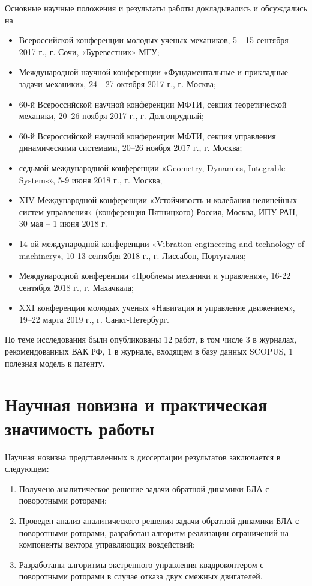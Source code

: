 Основные научные положения и результаты работы докладывались и обсуждались на 
\begin{itemize}
\item Всероссийской конференции молодых ученых-механиков, 5 - 15 сентября 2017 г., г. Сочи, «Буревестник» МГУ;
\item Международной научной конференции «Фундаментальные и прикладные задачи механики», 24 - 27 октября 2017 г., г. Москва;
\item 60-й Всероссийской научной конференции МФТИ, секция теоретической механики, 20–26 ноября 2017 г., г. Долгопрудный;
\item 60-й Всероссийской научной конференции МФТИ, секция управления динамическими системами, 20–26 ноября 2017 г., г. Москва;
\item седьмой международной конференции «Geometry, Dynamics, Integrable Systems», 5-9 июня 2018 г., г. Москва;
\item XIV Международной конференции «Устойчивость и колебания нелинейных систем управления» (конференция Пятницкого) Россия, Москва, ИПУ РАН, 30 мая -- 1 июня 2018 г.
\item 14-ой международной конференции «Vibration engineering and technology of machinery», 10-13 сентября 2018 г., г. Лиссабон, Португалия;
\item Международной конференции «Проблемы механики и управления», 16-22 сентября 2018 г., г. Махачкала;
\item XXI конференции молодых ученых «Навигация и управление движением», 19–22 марта 2019 г., г. Санкт-Петербург.
\end{itemize}
По теме исследования были опубликованы 12 работ, в том числе 3 в журналах, рекомендованных ВАК РФ, 1 в журнале, входящем в базу данных SCOPUS, 1 полезная модель к патенту.

\section{Научная новизна и практическая значимость работы}
Научная новизна представленных в диссертации результатов заключается в следующем:
\begin{enumerate}
	\item  Получено аналитическое решение задачи обратной динамики БЛА с поворотными роторами;
	\item  Проведен анализ аналитического решения задачи обратной динамики  БЛА с поворотными роторами, разработан алгоритм реализации ограничений на компоненты вектора управляющих воздействий;
	\item  Разработаны алгоритмы экстренного управления квадрокоптером с поворотными роторами в случае отказа двух смежных двигателей.
\end{enumerate}

